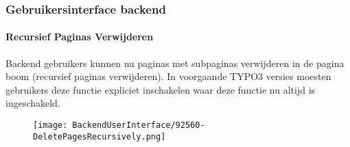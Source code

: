 %

\begin{frame}[fragile]
	\frametitle{Gebruikersinterface backend}
	\framesubtitle{Recursief Paginas Verwijderen}

	Backend gebruikers kunnen nu paginas met subpaginas verwijderen in de pagina
	boom (recursief paginas verwijderen).
	In voorgaande TYPO3 versies moesten gebruikers deze functie expliciet inschakelen
	waar deze functie nu altijd is ingeschakeld.

	\begin{figure}
		\texttt{[image: BackendUserInterface/92560-DeletePagesRecursively.png]}
	\end{figure}

\end{frame}

